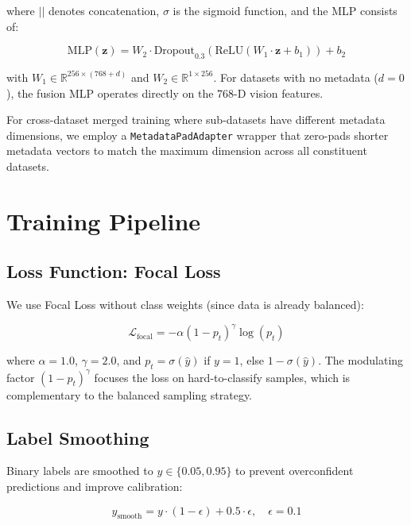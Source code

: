 \documentclass[12pt,a4paper]{report}
\begin{document}
\noindent where $||$ denotes concatenation, $\sigma$ is the sigmoid function, and the MLP consists of:

\begin{equation}
    \text{MLP}(\mathbf{z}) = W_2 \cdot \text{Dropout}_{0.3}\left( \text{ReLU}\left( W_1 \cdot \mathbf{z} + b_1 \right) \right) + b_2
    \label{eq:mlp}
\end{equation}

\noindent with $W_1 \in \mathbb{R}^{256 \times (768 + d)}$ and $W_2 \in \mathbb{R}^{1 \times 256}$. For datasets with no metadata ($d = 0$), the fusion MLP operates directly on the 768-D vision features.

For cross-dataset merged training where sub-datasets have different metadata dimensions, we employ a \texttt{MetadataPadAdapter} wrapper that zero-pads shorter metadata vectors to match the maximum dimension across all constituent datasets.

\section{Training Pipeline}

\subsection{Loss Function: Focal Loss}

We use Focal Loss \cite{lin2017focal} without class weights (since data is already balanced):

\begin{equation}
    \mathcal{L}_{\text{focal}} = -\alpha (1 - p_t)^\gamma \log(p_t)
    \label{eq:focal}
\end{equation}

\noindent where $\alpha = 1.0$, $\gamma = 2.0$, and $p_t = \sigma(\hat{y})$ if $y = 1$, else $1 - \sigma(\hat{y})$. The modulating factor $(1 - p_t)^\gamma$ focuses the loss on hard-to-classify samples, which is complementary to the balanced sampling strategy.

\subsection{Label Smoothing}

Binary labels are smoothed to $y \in \{0.05, 0.95\}$ to prevent overconfident predictions and improve calibration:

\begin{equation}
    y_{\text{smooth}} = y \cdot (1 - \epsilon) + 0.5 \cdot \epsilon, \quad \epsilon = 0.1
    \label{eq:label_smooth}
\end{equation}
\end{document}
